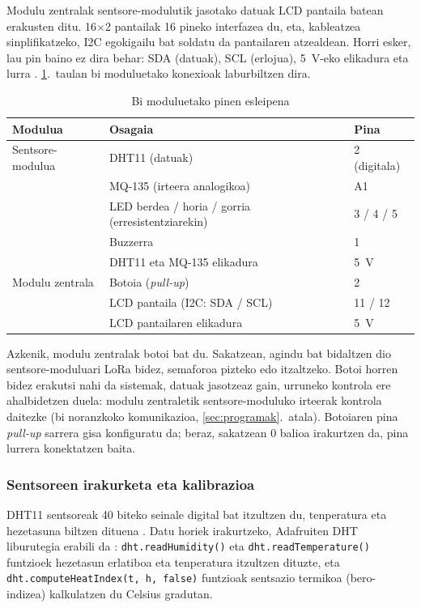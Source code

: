 \documentclass[10pt]{article}
\begin{document}
Modulu zentralak sentsore-modulutik jasotako datuak \ac{LCD} pantaila batean erakusten ditu. 16$\times$2 pantailak 16 pineko interfazea du, eta, kableatzea sinplifikatzeko, \ac{I2C} egokigailu bat soldatu da pantailaren atzealdean. Horri esker, lau pin baino ez dira behar: \acs{SDA} (datuak), \acs{SCL} (erlojua), 5~V-eko elikadura eta lurra \cite{arduino_wire}. \ref{taula:pinak}.~taulan bi moduluetako konexioak laburbiltzen dira.\\

\begin{table}[H]
\centering
\small
\begin{tabular}{l l l}
\hline
\textbf{Modulua} & \textbf{Osagaia} & \textbf{Pina} \\
\hline
Sentsore-modulua & DHT11 (datuak) & 2 (digitala) \\
 & MQ-135 (irteera analogikoa) & A1 \\
 & LED berdea / horia / gorria (erresistentziarekin) & 3 / 4 / 5 \\
 & Buzzerra & 1 \\
 & DHT11 eta MQ-135 elikadura & 5~V \\
\hline
Modulu zentrala & Botoia (\textit{pull-up}) & 2 \\
 & \ac{LCD} pantaila (\ac{I2C}: \acs{SDA} / \acs{SCL}) & 11 / 12 \\
 & \ac{LCD} pantailaren elikadura & 5~V \\
\hline
\end{tabular}
\caption{Bi moduluetako pinen esleipena}
\label{taula:pinak}
\end{table}

Azkenik, modulu zentralak botoi bat du. Sakatzean, agindu bat bidaltzen dio sentsore-moduluari \ac{LoRa} bidez, semaforoa pizteko edo itzaltzeko. Botoi horren bidez erakutsi nahi da sistemak, datuak jasotzeaz gain, urruneko kontrola ere ahalbidetzen duela: modulu zentraletik sentsore-moduluko irteerak kontrola daitezke (bi noranzkoko komunikazioa, \ref{sec:programak}.~atala). Botoiaren pina \textit{pull-up} sarrera gisa konfiguratu da; beraz, sakatzean 0 balioa irakurtzen da, pina lurrera konektatzen baita.\\

\subsubsection{Sentsoreen irakurketa eta kalibrazioa}
\label{sec:kalibrazioa}

DHT11 sentsoreak 40 biteko seinale digital bat itzultzen du, tenperatura eta hezetasuna biltzen dituena \cite{dht11datasheet}. Datu horiek irakurtzeko, Adafruiten DHT liburutegia erabili da \cite{adafruit_dht}: \texttt{dht.readHumidity()} eta \texttt{dht.readTemperature()} funtzioek hezetasun erlatiboa eta tenperatura itzultzen dituzte, eta \texttt{dht.computeHeatIndex(t, h, false)} funtzioak sentsazio termikoa (bero-indizea) kalkulatzen du Celsius gradutan.\\
\end{document}
